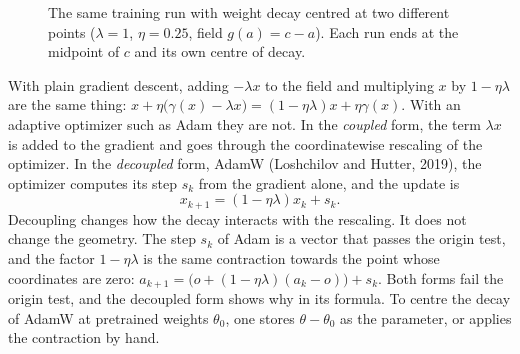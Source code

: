 \begin{notechapter}
\begin{figure}[ht]
\centering
{}
\caption{The same training run with weight decay centred at two different
points ($\lambda = 1$, $\eta = 0.25$, field $g(a) = c - a$). Each run ends
at the midpoint of $c$ and its own centre of decay.}
\label{affine-spaces:fig:decay}
\end{figure}

\begin{remark}
\label{affine-spaces:rem:adamw}
With plain gradient descent, adding $-\lambda x$ to the field and
multiplying $x$ by $1 - \eta\lambda$ are the same thing:
$x + \eta\bigl(\gamma(x) - \lambda x\bigr)
= (1 - \eta\lambda)x + \eta\gamma(x)$. With an adaptive optimizer such as
Adam they are not. In the \emph{coupled} form, the term $\lambda x$ is added
to the gradient and goes through the coordinatewise rescaling of the
optimizer. In the \emph{decoupled} form, AdamW (Loshchilov and Hutter,
2019), the optimizer computes its step $s_k$ from the gradient alone, and
the update is
\[
  x_{k+1} = (1 - \eta\lambda)x_k + s_k .
\]
Decoupling changes how the decay interacts with the rescaling. It does not
change the geometry. The step $s_k$ of Adam is a vector that passes the
origin test, and the factor $1 - \eta\lambda$ is the same contraction
towards the point whose coordinates are zero:
$a_{k+1} = \bigl(o + (1 - \eta\lambda)(a_k - o)\bigr) + s_k$. Both forms
fail the origin test, and the decoupled form shows why in its formula. To
centre the decay of AdamW at pretrained weights $\theta_0$, one stores
$\theta - \theta_0$ as the parameter, or applies the contraction by hand.
\end{remark}


\end{notechapter}
